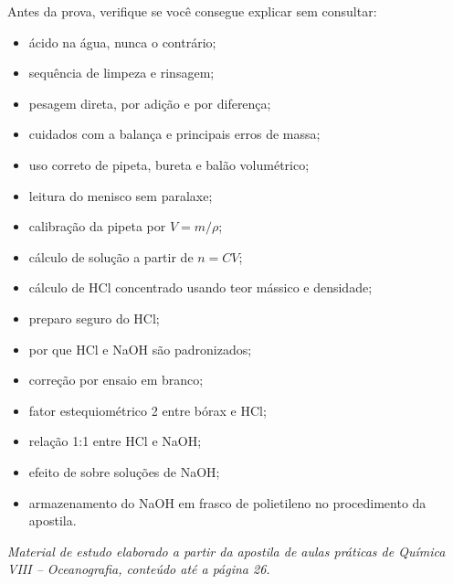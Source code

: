 \documentclass[a4paper,12pt]{article}
\begin{document}
\begin{memorize}
Antes da prova, verifique se você consegue explicar sem consultar:
\begin{itemize}[leftmargin=1.6em]
    \item ácido na água, nunca o contrário;
    \item sequência de limpeza e rinsagem;
    \item pesagem direta, por adição e por diferença;
    \item cuidados com a balança e principais erros de massa;
    \item uso correto de pipeta, bureta e balão volumétrico;
    \item leitura do menisco sem paralaxe;
    \item calibração da pipeta por $V=m/\rho$;
    \item cálculo de solução a partir de $n=CV$;
    \item cálculo de HCl concentrado usando teor mássico e densidade;
    \item preparo seguro do HCl;
    \item por que HCl e NaOH são padronizados;
    \item correção por ensaio em branco;
    \item fator estequiométrico 2 entre bórax e HCl;
    \item relação 1:1 entre HCl e NaOH;
    \item efeito de  sobre soluções de NaOH;
    \item armazenamento do NaOH em frasco de polietileno no procedimento da apostila.
\end{itemize}
\end{memorize}

\vfill
\begin{center}
\small\textit{Material de estudo elaborado a partir da apostila de aulas práticas de Química VIII -- Oceanografia, conteúdo até a página 26.}
\end{center}
\end{document}
